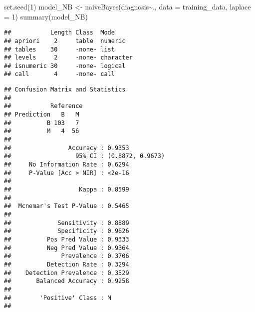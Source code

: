 \documentclass[
]{article}
\newenvironment{Shaded}{\begin{snugshade}}{\end{snugshade}}
\newcommand{\AttributeTok}[1]{\textcolor[rgb]{0.77,0.63,0.00}{#1}}
\newcommand{\CommentTok}[1]{\textcolor[rgb]{0.56,0.35,0.01}{\textit{#1}}}
\newcommand{\DecValTok}[1]{\textcolor[rgb]{0.00,0.00,0.81}{#1}}
\newcommand{\FunctionTok}[1]{\textcolor[rgb]{0.00,0.00,0.00}{#1}}
\newcommand{\NormalTok}[1]{#1}
\newcommand{\OtherTok}[1]{\textcolor[rgb]{0.56,0.35,0.01}{#1}}
\newcommand{\SpecialCharTok}[1]{\textcolor[rgb]{0.00,0.00,0.00}{#1}}
\newcommand{\StringTok}[1]{\textcolor[rgb]{0.31,0.60,0.02}{#1}}
\begin{document}
\begin{Shaded}
\begin{Highlighting}[]
\FunctionTok{set.seed}\NormalTok{(}\DecValTok{1}\NormalTok{) }
\NormalTok{model\_NB }\OtherTok{\textless{}{-}} \FunctionTok{naiveBayes}\NormalTok{(diagnosis}\SpecialCharTok{\textasciitilde{}}\NormalTok{., }\AttributeTok{data =}\NormalTok{ training\_data, }\AttributeTok{laplace =} \DecValTok{1}\NormalTok{)}
\FunctionTok{summary}\NormalTok{(model\_NB)}
\end{Highlighting}
\end{Shaded}

\begin{verbatim}
##           Length Class  Mode     
## apriori    2     table  numeric  
## tables    30     -none- list     
## levels     2     -none- character
## isnumeric 30     -none- logical  
## call       4     -none- call
\end{verbatim}

\begin{Shaded}
\end{Shaded}

\begin{verbatim}
## Confusion Matrix and Statistics
## 
##           Reference
## Prediction   B   M
##          B 103   7
##          M   4  56
##                                           
##                Accuracy : 0.9353          
##                  95% CI : (0.8872, 0.9673)
##     No Information Rate : 0.6294          
##     P-Value [Acc > NIR] : <2e-16          
##                                           
##                   Kappa : 0.8599          
##                                           
##  Mcnemar's Test P-Value : 0.5465          
##                                           
##             Sensitivity : 0.8889          
##             Specificity : 0.9626          
##          Pos Pred Value : 0.9333          
##          Neg Pred Value : 0.9364          
##              Prevalence : 0.3706          
##          Detection Rate : 0.3294          
##    Detection Prevalence : 0.3529          
##       Balanced Accuracy : 0.9258          
##                                           
##        'Positive' Class : M               
## 
\end{verbatim}
\end{document}
